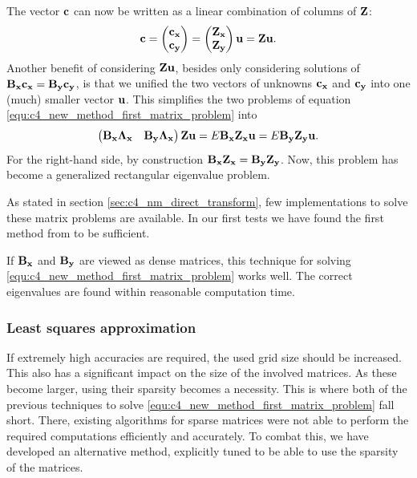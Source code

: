 The vector $\vb{c}$ can now be written as a linear combination of columns of $\vb{Z}$:
$$
    \vb{c} = \begin{pmatrix}\vb{c_x} \\ \vb{c_y} \end{pmatrix} = \begin{pmatrix} \vb{Z_x} \\ \vb{Z_y} \end{pmatrix}  \vb{u} = \vb{Z} \vb{u} \text{.}
$$
Another benefit of considering $\vb{Z}\vb{u}$, besides only considering solutions of $\vb{B_x} \vb{c_x} = \vb{B_y} \vb{c_y}$, is that we unified the two vectors of unknowns $\vb{c_x}$ and $\vb{c_y}$ into one (much) smaller vector $\vb{u}$. This simplifies the two problems of equation \eqref{equ:c4_new_method_first_matrix_problem} into
$$
    \begin{pmatrix}
        \vb{B_x}\vb{\Lambda_x} & \vb{B_y}\vb{\Lambda_x}
    \end{pmatrix} \vb{Z} \vb{u} = E \vb{B_x} \vb{Z_x} \vb{u} = E \vb{B_y} \vb{Z_y} \vb{u} \text{.}
$$
For the right-hand side, by construction $\vb{B_x} \vb{Z_x} = \vb{B_y} \vb{Z_y}$. Now, this problem has become a generalized rectangular eigenvalue problem.

As stated in section \ref{sec:c4_nm_direct_transform}, few implementations to solve these matrix problems are available. In our first tests we have found the first method from \cite{hua_svd_1991} to be sufficient.

If $\vb{B_x}$ and $\vb{B_y}$ are viewed as dense matrices, this technique for solving \eqref{equ:c4_new_method_first_matrix_problem} works well. The correct eigenvalues are found within reasonable computation time.

\subsubsection{Least squares approximation}\label{sec:c4_matrix_least_squares}

If extremely high accuracies are required, the used grid size should be increased. This also has a significant impact on the size of the involved matrices. As these become larger, using their sparsity becomes a necessity. This is where both of the previous techniques to solve \eqref{equ:c4_new_method_first_matrix_problem} fall short. There, existing algorithms for sparse matrices were not able to perform the required computations efficiently and accurately. To combat this, we have developed an alternative method, explicitly tuned to be able to use the sparsity of the matrices.

